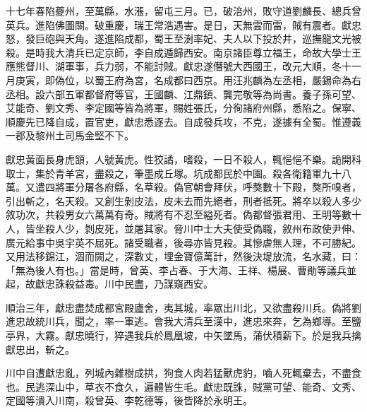 \begin{pinyinscope}
十七年春陷夔州，至萬縣，水漲，留屯三月。已，破涪州，敗守道劉麟長、總兵曾英兵。進陷佛圖關。破重慶，瑞王常浩遇害。是日，天無雲而雷，賊有震者。獻忠怒，發巨砲與天角。遂進陷成都，蜀王至澍率妃、夫人以下投於井，巡撫龍文光被殺。是時我大清兵已定京師，李自成遁歸西安。南京諸臣尊立福王，命故大學士王應熊督川、湖軍事，兵力弱，不能討賊。獻忠遂僭號大西國王，改元大順，冬十一月庚寅，即偽位，以蜀王府為宮，名成都曰西京。用汪兆麟為左丞相，嚴錫命為右丞相。設六部五軍都督府等官，王國麟、江鼎鎮、龔完敬等為尚書。養子孫可望、艾能奇、劉文秀、李定國等皆為將軍，賜姓張氏，分徇諸府州縣，悉陷之。保寧、順慶先已降自成，置官吏，獻忠悉逐去。自成發兵攻，不克，遂據有全蜀。惟遵義一郡及黎州土司馬金堅不下。

獻忠黃面長身虎頷，人號黃虎。性狡譎，嗜殺，一日不殺人，輒悒悒不樂。詭開科取士，集於青羊宮，盡殺之，筆墨成丘塚。坑成都民於中園。殺各衛籍軍九十八萬。又遣四將軍分屠各府縣，名草殺。偽官朝會拜伏，呼獒數十下殿，獒所嗅者，引出斬之，名天殺。又創生剝皮法，皮未去而先絕者，刑者抵死。將卒以殺人多少敘功次，共殺男女六萬萬有奇。賊將有不忍至縊死者。偽都督張君用、王明等數十人，皆坐殺人少，剝皮死，並屠其家。脅川中士大夫使受偽職，敘州布政使尹伸、廣元給事中吳宇英不屈死。諸受職者，後尋亦皆見殺。其慘虐無人理，不可勝紀。又用法移錦江，涸而闕之，深數丈，埋金寶億萬計，然後決堤放流，名水藏，曰：「無為後人有也。」當是時，曾英、李占春、于大海、王祥、楊展、曹勛等議兵並起，故獻忠誅殺益毒。川中民盡，乃謀窺西安。

順治三年，獻忠盡焚成都宮殿廬舍，夷其城，率眾出川北，又欲盡殺川兵。偽將劉進忠故統川兵，聞之，率一軍逃。會我大清兵至漢中，進忠來奔，乞為鄉導。至鹽亭界，大霧。獻忠曉行，猝遇我兵於鳳凰坡，中矢墜馬，蒲伏積薪下。於是我兵擒獻忠出，斬之。

川中自遭獻忠亂，列城內雜樹成拱，狗食人肉若猛獸虎豹，嚙人死輒棄去，不盡食也。民逃深山中，草衣不食久，遍體皆生毛。獻忠既誅，賊黨可望、能奇、文秀、定國等潰入川南，殺曾英、李乾德等，後皆降於永明王。


\end{pinyinscope}